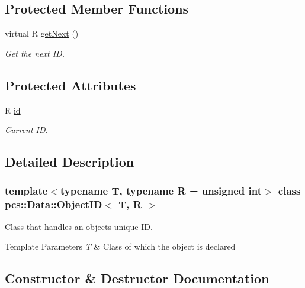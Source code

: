\subsection*{Protected Member Functions}
\begin{DoxyCompactItemize}
\item 
virtual R \hyperlink{classpcs_1_1Data_1_1ObjectID_a01456dc5ee820984c83c089e413255ec}{get\+Next} ()
\begin{DoxyCompactList}\small\item\em Get the next ID. \end{DoxyCompactList}\end{DoxyCompactItemize}
\subsection*{Protected Attributes}
\begin{DoxyCompactItemize}
\item 
R \hyperlink{classpcs_1_1Data_1_1ObjectID_a69a11bfb96a9078095de9bb139b06913}{id}
\begin{DoxyCompactList}\small\item\em Current ID. \end{DoxyCompactList}\end{DoxyCompactItemize}


\subsection{Detailed Description}
\subsubsection*{template$<$typename T, typename R = unsigned int$>$\newline
class pcs\+::\+Data\+::\+Object\+I\+D$<$ T, R $>$}

Class that handles an object\textquotesingle{}s unique ID. 


\begin{DoxyTemplParams}{Template Parameters}
{\em T} & Class of which the object is declared \\
\hline
\end{DoxyTemplParams}


\subsection{Constructor \& Destructor Documentation}
\mbox{\label{classpcs_1_1Data_1_1ObjectID_aa94cbbd6c36354f876de0b6847a07ed0}} 
